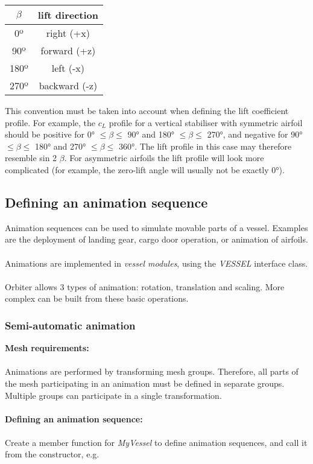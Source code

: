 \documentclass[Orbiter Developer Manual.tex]{subfiles}
\begin{document}
\begin{table}[H]
	\centering
	\begin{tabular}{ |c|c| }
	\hline\rule{0pt}{2ex}
	\textbf{$\beta$} & \textbf{lift direction} \\
	\hline\rule{0pt}{2ex}
	0º & right (+x)\\
	\hline\rule{0pt}{2ex}
	90º & forward (+z)\\
	\hline\rule{0pt}{2ex}
	180º & left (-x)\\
	\hline\rule{0pt}{2ex}
	270º & backward (-z)\\
	\hline
	\end{tabular}
\end{table}

\noindent
This convention must be taken into account when defining the lift coefficient profile. For example, the $c_{L}$ profile for a vertical stabiliser with symmetric airfoil should be positive for 0° $\leq \beta \leq$ 90° and 180° $\leq \beta \leq$ 270°, and negative for 90° $\leq \beta \leq$ 180° and 270° $\leq \beta \leq$ 360°. The lift profile in this case may therefore resemble sin 2 $\beta$. For asymmetric airfoils the lift profile will look more complicated (for example, the zero-lift angle will usually not be exactly 0°).


\subsection{Defining an animation sequence}
Animation sequences can be used to simulate movable parts of a vessel. Examples are the deployment of landing gear, cargo door operation, or animation of airfoils.\\
\\
Animations are implemented in \textit{vessel modules}, using the \textit{VESSEL} interface class.\\
\\
Orbiter allows 3 types of animation: rotation, translation and scaling. More complex can be built from these basic operations.


\subsubsection{Semi-automatic animation}
\textbf{Mesh requirements:}\\
\\
Animations are performed by transforming mesh groups. Therefore, all parts of the mesh participating in an animation must be defined in separate groups. Multiple groups can participate in a single transformation.\\
\\
\textbf{Defining an animation sequence:}\\
\\
Create a member function for \textit{MyVessel} to define animation sequences, and call it from the constructor, e.g.
\end{document}
